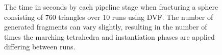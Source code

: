 \begin{figure}[h!]
\caption{The time in seconds by each pipeline stage when fracturing a sphere consisting of 760 triangles over 10 runs using DVF. The number of generated fragments can vary slightly, resulting in the number of times the marching tetrahedra and instantiation phases are applied differing between runs.}
\label{fig:A.1}
\end{figure}